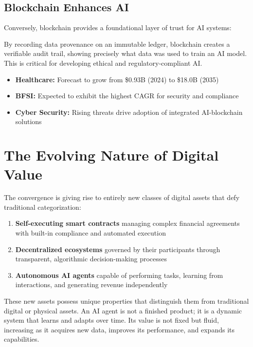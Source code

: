 \documentclass[11pt,a4paper]{report}
\begin{document}
\subsection{Blockchain Enhances AI}

Conversely, blockchain provides a foundational layer of trust for AI systems:

\begin{keypoint}
By recording data provenance on an immutable ledger, blockchain creates a verifiable audit trail, showing precisely what data was used to train an AI model. This is critical for developing ethical and regulatory-compliant AI.
\end{keypoint}

\begin{marketfigure}
\begin{itemize}
    \item \textbf{Healthcare:} Forecast to grow from \$0.93B (2024) to \$18.0B (2035)
    \item \textbf{BFSI:} Expected to exhibit the highest CAGR for security and compliance
    \item \textbf{Cyber Security:} Rising threats drive adoption of integrated AI-blockchain solutions
\end{itemize}
\end{marketfigure}

\section{The Evolving Nature of Digital Value}

The convergence is giving rise to entirely new classes of digital assets that defy traditional categorization:

\begin{enumerate}
    \item \textbf{Self-executing smart contracts} managing complex financial agreements with built-in compliance and automated execution
    \item \textbf{Decentralized ecosystems} governed by their participants through transparent, algorithmic decision-making processes
    \item \textbf{Autonomous AI agents} capable of performing tasks, learning from interactions, and generating revenue independently
\end{enumerate}

These new assets possess unique properties that distinguish them from traditional digital or physical assets. An AI agent is not a finished product; it is a dynamic system that learns and adapts over time. Its value is not fixed but fluid, increasing as it acquires new data, improves its performance, and expands its capabilities.
\end{document}
